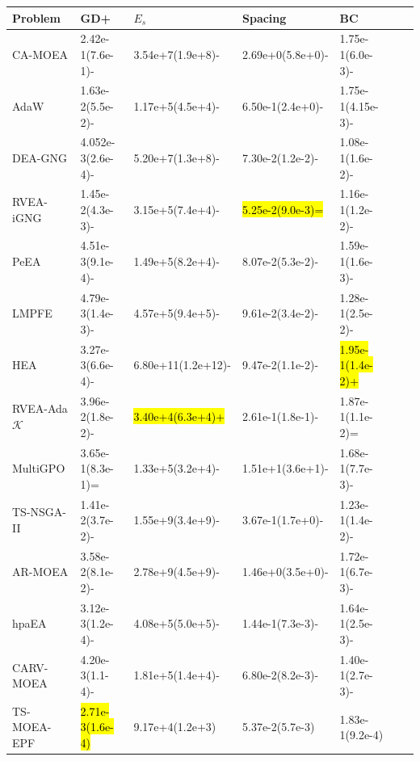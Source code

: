 \documentclass[a4paper,fleqn]{cas-dc}
\newcommand{\highlight}[1]{
	\begingroup
	\sethlcolor{Seashell}%
	\hl{#1}%
	\endgroup
}
\begin{document}
\begin{sloppypar}
\begin{table}[ht!]
{		%
			\begin{tabular}{lllllll} \hline %
				\toprule[0.7pt]
				Problem & GD+ & $E_{s}$ &Spacing  &BC\\
				\midrule[0.35pt]
				
				{CA-MOEA} 	&2.42e-1(7.6e-1)- 	&3.54e+7(1.9e+8)-	&2.69e+0(5.8e+0)-	&1.75e-1(6.0e-3)-\\
				
				{AdaW} 	&1.63e-2(5.5e-2)- &1.17e+5(4.5e+4)-	&6.50e-1(2.4e+0)-	&1.75e-1(4.15e-3)-	\\
				
				{DEA-GNG} 	&4.052e-3(2.6e-4)-	&5.20e+7(1.3e+8)-	&7.30e-2(1.2e-2)-	&1.08e-1(1.6e-2)-\\ 
				
				{RVEA-iGNG} 	&1.45e-2(4.3e-3)-	&3.15e+5(7.4e+4)-	&\highlight{5.25e-2(9.0e-3)=}	&1.16e-1(1.2e-2)-\\ 
				
				{PeEA}  	&4.51e-3(9.1e-4)- 	&1.49e+5(8.2e+4)-	&8.07e-2(5.3e-2)-	&1.59e-1(1.6e-3)-\\ 
				
				{LMPFE} 	&4.79e-3(1.4e-3)- &4.57e+5(9.4e+5)-	&9.61e-2(3.4e-2)-	&1.28e-1(2.5e-2)-	\\ 
				
				{HEA} &3.27e-3(6.6e-4)- 	&6.80e+11(1.2e+12)-	&9.47e-2(1.1e-2)-	&\highlight{1.95e-1(1.4e-2)+}\\
				
				{RVEA-Ada$\mathcal{K}$} &3.96e-2(1.8e-2)- 	&\highlight{3.40e+4(6.3e+4)+}	&2.61e-1(1.8e-1)-	&1.87e-1(1.1e-2)=\\ 
				
				{{MultiGPO}} &3.65e-1(8.3e-1)= &1.33e+5(3.2e+4)-	&1.51e+1(3.6e+1)-	&1.68e-1(7.7e-3)-	\\ 
				
				{{TS-NSGA-II}} &1.41e-2(3.7e-2)- 	&1.55e+9(3.4e+9)-	&3.67e-1(1.7e+0)-	&1.23e-1(1.4e-2)-\\
				{{AR-MOEA}} &3.58e-2(8.1e-2)-  &2.78e+9(4.5e+9)-	&1.46e+0(3.5e+0)-	&1.72e-1(6.7e-3)-	\\ 
				
				{{hpaEA}} 	&3.12e-3(1.2e-4)- 	&4.08e+5(5.0e+5)-	&1.44e-1(7.3e-3)-	&1.64e-1(2.5e-3)- \\ 
				{{CARV-MOEA}} &4.20e-3(1.1-4)- &1.81e+5(1.4e+4)-	&6.80e-2(8.2e-3)-	&1.40e-1(2.7e-3)-	\\ 
				{TS-MOEA-EPF} &\highlight{2.71e-3(1.6e-4)} 	&9.17e+4(1.2e+3)	&5.37e-2(5.7e-3)	&1.83e-1(9.2e-4)\\ 
				

\end{tabular}}
\end{table}
\end{sloppypar}
\end{document}
